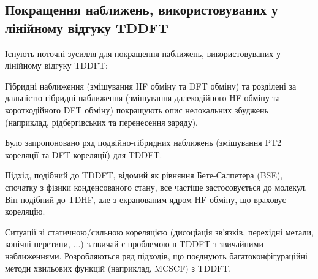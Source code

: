 \documentclass{PySCFBook}
\begin{document}
\subsection{Покращення наближень, використовуваних у лінійному відгуку TDDFT}

Існують поточні зусилля для покращення наближень, використовуваних у лінійному відгуку TDDFT:

Гібридні наближення (змішування HF обміну та DFT обміну) та розділені за дальністю гібридні наближення (змішування далекодійного HF обміну та короткодійного DFT обміну) покращують опис нелокальних збуджень (наприклад, рідбергівських та перенесення заряду).

Було запропоновано ряд подвійно-гібридних наближень (змішування PT2 кореляції та DFT кореляції) для TDDFT.

Підхід, подібний до TDDFT, відомий як рівняння Бете-Салпетера (BSE), спочатку з фізики конденсованого стану, все частіше застосовується до молекул. Він подібний до TDHF, але з екранованим ядром HF обміну, що враховує кореляцію.

Ситуації зі статичною/сильною кореляцією (дисоціація зв'язків, перехідні метали, конічні перетини, ...) зазвичай є проблемою в TDDFT з звичайними наближеннями. Розробляються ряд підходів, що поєднують багатоконфігураційні методи хвильових функцій (наприклад, MCSCF) з TDDFT.
\end{document}
